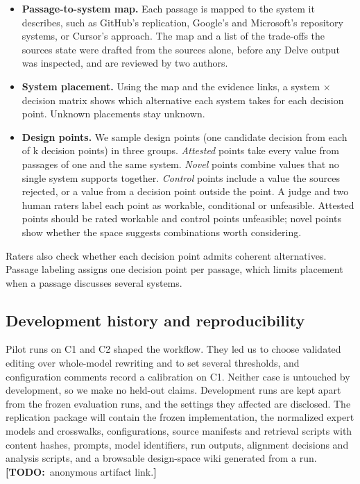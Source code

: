 \documentclass[conference]{IEEEtran}
\providecommand{\tightlist}{\setlength{\itemsep}{0pt}\setlength{\parskip}{0pt}}
\newcommand{\todo}[1]{{\color{red}\textbf{[TODO:}~#1\textbf{]}}}
\begin{document}
\begin{itemize}
\tightlist
\item
  \textbf{Passage-to-system map.} Each passage is mapped to the system it describes, such as GitHub's replication, Google's and Microsoft's repository systems, or Cursor's approach. The map and a list of the trade-offs the sources state were drafted from the sources alone, before any Delve output was inspected, and are reviewed by two authors.
\item
  \textbf{System placement.} Using the map and the evidence links, a system $\times$ decision matrix shows which alternative each system takes for each decision point. Unknown placements stay unknown.
\item
  \textbf{Design points.} We sample design points (one candidate decision from each of k decision points) in three groups. \emph{Attested} points take every value from passages of one and the same system. \emph{Novel} points combine values that no single system supports together. \emph{Control} points include a value the sources rejected, or a value from a decision point outside the point. A judge and two human raters label each point as workable, conditional or unfeasible. Attested points should be rated workable and control points unfeasible; novel points show whether the space suggests combinations worth considering.
\end{itemize}

Raters also check whether each decision point admits coherent alternatives. Passage labeling assigns one decision point per passage, which limits placement when a passage discusses several systems.

\subsection{Development history and reproducibility}

Pilot runs on C1 and C2 shaped the workflow. They led us to choose validated editing over whole-model rewriting and to set several thresholds, and configuration comments record a calibration on C1. Neither case is untouched by development, so we make no held-out claims. Development runs are kept apart from the frozen evaluation runs, and the settings they affected are disclosed. The replication package will contain the frozen implementation, the normalized expert models and crosswalks, configurations, source manifests and retrieval scripts with content hashes, prompts, model identifiers, run outputs, alignment decisions and analysis scripts, and a browsable design-space wiki generated from a run. \todo{anonymous artifact link.}
\end{document}

